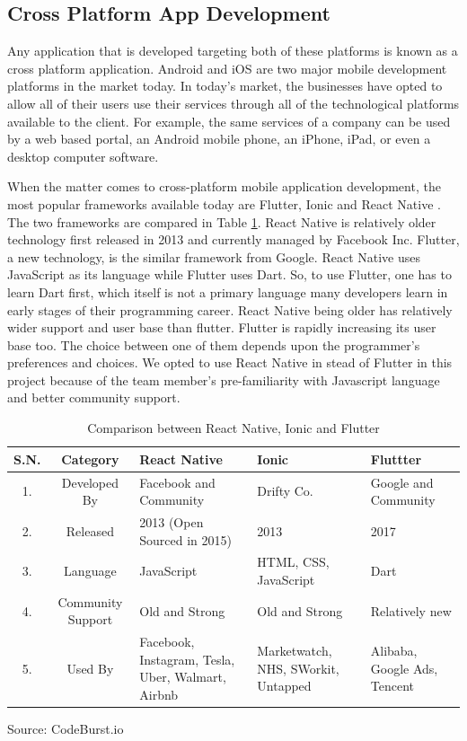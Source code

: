 \documentclass[12pt, a4paper, oneside]{article}
\begin{document}
\subsection{Cross Platform App Development}
Any application that is developed targeting both of these platforms is known as a cross platform application. Android and iOS are two major mobile development platforms in the market today. In today's market, the businesses have opted to allow all of their users use their services through all of the technological platforms available to the client. For example, the same services of a company can be used by a web based portal, an Android mobile phone, an iPhone, iPad, or even a desktop computer software.

When the matter comes to cross-platform mobile application development, the most popular frameworks available today are Flutter, Ionic and React Native \cite{rnvsflutter}. The two frameworks are compared in Table \ref{table:rnvsflutter}. React Native is relatively older technology first released in 2013 and currently managed by Facebook Inc. Flutter, a new technology, is the similar framework from Google. React Native uses JavaScript as its language while Flutter uses Dart. So, to use Flutter, one has to learn Dart first, which itself is not a primary language many developers learn in early stages of their programming career. React Native being older has relatively wider support and user base than flutter. Flutter is rapidly increasing its user base too. The choice between one of them depends upon the programmer's preferences and choices. We opted to use React Native in stead of Flutter in this project because of the team member's pre-familiarity with Javascript language and better community support. 


\renewcommand{\arraystretch}{1.5}
\begin{table}[H]
\begin{tabularx}{\linewidth}{|c|c|X|X|X|}
\hline
\rowcolor[HTML]{C0C0C0} 
\textbf{S.N.}                & \textbf{Category} & \textbf{React Native} & \textbf{Ionic} & \textbf{Fluttter}   \\ \hline
1. & Developed By    & Facebook and Community  & Drifty Co. & Google and Community     \\ \hline
2. & Released   & 2013 (Open Sourced in 2015)  & 2013 & 2017     \\ \hline
3. & Language    & JavaScript  & HTML, CSS, JavaScript & Dart     \\ \hline
4. & Community Support  & Old and Strong  & Old and Strong & Relatively new     \\ \hline
5. & Used By   & Facebook, Instagram, Tesla, Uber, Walmart, Airbnb  & Marketwatch, NHS, SWorkit, Untapped & Alibaba, Google Ads, Tencent     \\ \hline
\end{tabularx}
\footnotesize Source: CodeBurst.io \cite{rnvsflutter}
\caption{Comparison between React Native, Ionic and Flutter}
\label{table:rnvsflutter}
\end{table}
\end{document}
